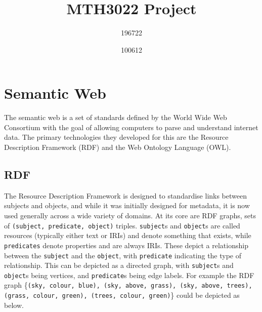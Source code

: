 \documentclass[english, 12pt]{article}
\title{MTH3022 Project} %
\author{196722 \and 100612}
\date{}
\begin{document}
\maketitle

\section{Semantic Web}
The semantic web is a set of standards defined by the World Wide Web Consortium\cite{w3c_website} with the goal of allowing computers to parse and understand internet data. The primary technologies they developed for this are the Resource Description Framework\cite{w3c_rdf} (RDF) and the Web Ontology Language\cite{w3c_owl} (OWL).

\subsection{RDF}
The Resource Description Framework is designed to standardise links between subjects and objects, and while it was initially designed for metadata, it is now used generally across a wide variety of domains. At its core are RDF graphs, sets of \texttt{(subject, predicate, object)} triples. \texttt{subject}s and \texttt{object}s are called resources (typically either text or IRIs\cite{iri_rfc}) and denote something that exists, while \texttt{predicates} denote properties and are always IRIs. These depict a relationship between the \texttt{subject} and the \texttt{object}, with \texttt{predicate} indicating the type of relationship. This can be depicted as a directed graph, with \texttt{subject}s and \texttt{object}s being vertices, and \texttt{predicate}s being edge labels. For example the RDF graph \{\texttt{(sky, colour, blue), (sky, above, grass), (sky, above, trees), (grass, colour, green), (trees, colour, green)}\} could be depicted as below.
\begin{figure}[H]
\centering
{}
\end{figure}
\end{document}
